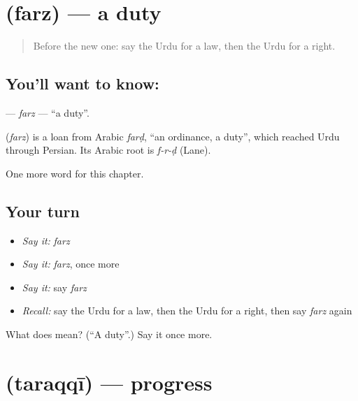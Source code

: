 \section[\texorpdfstring{\ur{فرض} (farz)}{فرض (farz)}]{ (farz) — a duty}

\label{lesson:UR-C205-farz}



\begin{quote}
Before the new one: say the Urdu for a law, then the Urdu for a right.
\end{quote}

\subsection*{You'll want to know: }
\textbf{} — \emph{farz} — \textquotedblleft{}a duty\textquotedblright{}.

\begin{cousinweb}
\textbf{} (\emph{farz}) is a loan from Arabic \emph{farḍ}, \textquotedblleft{}an ordinance, a duty\textquotedblright{}, which reached Urdu through Persian. Its Arabic root is \emph{f-r-ḍ} (Lane).
\end{cousinweb}

\begin{grammarlens}[title={What you've built}]
One more word for this chapter.
\end{grammarlens}

\subsection*{Your turn}
\begin{itemize}
\raggedright
  \item \emph{Say it:} \emph{farz}
  \item \emph{Say it:} \emph{farz}, once more
  \item \emph{Say it:} say \emph{farz}
  \item \emph{Recall:} say the Urdu for a law, then the Urdu for a right, then say \emph{farz} again
\end{itemize}

\begin{tcolorbox}[breakable,colback=teal!4,colframe=teal!35!black,title={Before you move on}]
What does  mean? (\textquotedblleft{}A duty\textquotedblright{}.) Say it once more.
\end{tcolorbox}
\section[\texorpdfstring{\ur{ترقی} (taraqqī)}{ترقی (taraqqī)}]{ (taraqqī) — progress}

